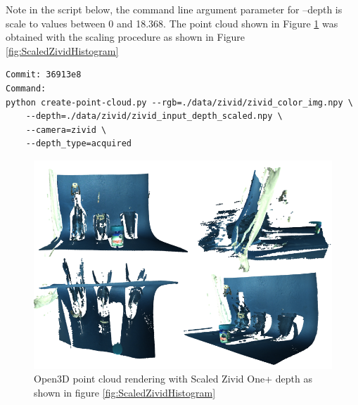 Note in the script below, the command line argument parameter for --depth is scale to values between 0 and 18.368. The point cloud shown in Figure \ref{fig:ZividNormHistIsometric} was obtained with the scaling procedure as shown in Figure \ref{fig:ScaledZividHistogram}

\begin{verbatim}
Commit: 36913e8
Command: 
python create-point-cloud.py --rgb=./data/zivid/zivid_color_img.npy \
    --depth=./data/zivid/zivid_input_depth_scaled.npy \
    --camera=zivid \
    --depth_type=acquired
\end{verbatim}

\begin{figure}[h!]
\centering
\includegraphics[width=\textwidth]{Figures/ZividNormHistIsometric.png}
\caption{Open3D point cloud rendering with Scaled Zivid One+ depth as shown in figure \ref{fig:ScaledZividHistogram}}
\label{fig:ZividNormHistIsometric}
\end{figure}



